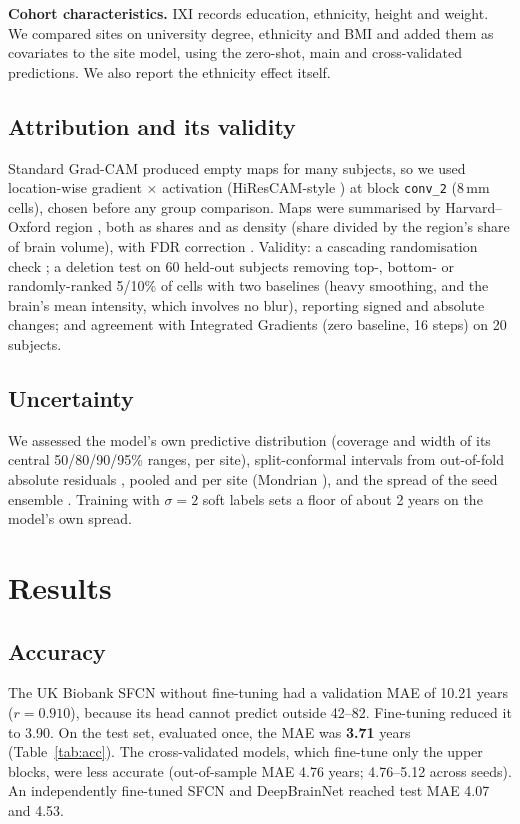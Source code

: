 \documentclass[conference]{IEEEtran}
\begin{document}
\textbf{Cohort characteristics.} IXI records education, ethnicity, height and weight. We compared sites on university degree, ethnicity and BMI and added them as covariates to the site model, using the zero-shot, main and cross-validated predictions. We also report the ethnicity effect itself.

\subsection{Attribution and its validity}
Standard Grad-CAM \cite{selvaraju2017gradcam} produced empty maps for many subjects, so we used location-wise gradient $\times$ activation (HiResCAM-style \cite{draelos2020hirescam}) at block \texttt{conv\_2} (8\,mm cells), chosen before any group comparison. Maps were summarised by Harvard--Oxford region \cite{jenkinson2012fsl}, both as shares and as density (share divided by the region's share of brain volume), with FDR correction \cite{benjamini1995fdr}. Validity: a cascading randomisation check \cite{adebayo2018sanity}; a deletion test \cite{samek2017evaluating,hooker2019benchmark} on 60 held-out subjects removing top-, bottom- or randomly-ranked 5/10\% of cells with two baselines (heavy smoothing, and the brain's mean intensity, which involves no blur), reporting signed and absolute changes; and agreement with Integrated Gradients \cite{sundararajan2017ig} (zero baseline, 16 steps) on 20 subjects.

\subsection{Uncertainty}
We assessed the model's own predictive distribution (coverage and width of its central 50/80/90/95\% ranges, per site), split-conformal intervals from out-of-fold absolute residuals \cite{angelopoulos2023conformal}, pooled and per site (Mondrian \cite{vovk2005algorithmic}), and the spread of the seed ensemble \cite{lakshminarayanan2017ensembles}. Training with $\sigma=2$ soft labels sets a floor of about 2 years on the model's own spread.

\section{Results}
\subsection{Accuracy}
The UK Biobank SFCN without fine-tuning had a validation MAE of 10.21 years ($r=0.910$), because its head cannot predict outside 42--82. Fine-tuning reduced it to 3.90. On the test set, evaluated once, the MAE was \textbf{3.71} years (Table~\ref{tab:acc}). The cross-validated models, which fine-tune only the upper blocks, were less accurate (out-of-sample MAE 4.76 years; 4.76--5.12 across seeds). An independently fine-tuned SFCN and DeepBrainNet reached test MAE 4.07 and 4.53.
\end{document}
